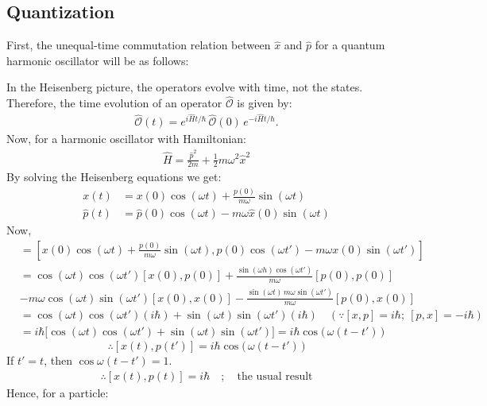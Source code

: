 \documentclass[14pt]{article} %
\begin{document}
{ \subsection{Quantization}
First, the unequal-time commutation relation between $\hat{x}$ and $\hat{p}$ for a quantum harmonic oscillator will be as follows:  

In the Heisenberg picture, the operators evolve with time, not the states. Therefore, the time evolution of an operator $\hat{\mathcal{O}}$ is given by:
\begin{align*}
\hat{\mathcal{O}}(t) = e^{i \hat{H} t / \hbar} \, \hat{\mathcal{O}}(0) \, e^{-i \hat{H} t / \hbar}.
\end{align*}
Now, for a harmonic oscillator with Hamiltonian:
\begin{align*}
\hat{H} = \frac{\hat{p}^2}{2m} + \frac{1}{2} m \omega^2 \hat{x}^2
\end{align*}
By solving the Heisenberg equations we get:
\begin{align*}
x(t) &= x(0) \cos(\omega t) + \frac{p(0)}{m \omega} \sin(\omega t) \\
\hat{p}(t) &= \hat{p}(0) \cos(\omega t) - m \omega \hat{x}(0) \sin(\omega t)
\end{align*}
Now,
\begin{align*}
[ x(t), p(t') ] &= \left[ x(0) \cos(\omega t) + \frac{p(0)}{m \omega} \sin(\omega t),
p(0) \cos(\omega t') - m \omega x(0) \sin(\omega t') \right] 
\\
&= \cos(\omega t) \cos(\omega t') [x(0), p(0)]
+ \frac{\sin(\omega h) \cos(\omega t')}{m \omega} [p(0), p(0)] 
\\
&- m \omega \cos(\omega t) \sin(\omega t') [x(0), x(0)]
- \frac{\sin(\omega t) \, m \omega \sin(\omega t')}{m \omega} [p(0), x(0)]
\\
&= \cos(\omega t) \cos(\omega t') (i \hbar) + \sin(\omega t) \sin(\omega t') (i \hbar) \quad \left(\because [x, p] = i \hbar;~ [p, x] = -i \hbar \right)
\\
&= i \hbar \big[ \cos(\omega t) \cos(\omega t') + \sin(\omega t) \sin(\omega t') \big] = i \hbar \cos\big( \,\omega(t - t')\, \big)
\end{align*}
\[
\therefore [ x(t), p(t') ] = i \hbar \cos\big( \,\omega(t - t')\, \big)
\]
If $t' = t$, then $\cos\omega(t-t') = 1$.
\begin{align*}
\therefore [x(t), p(t)] = i \hbar \quad;\quad \text{the usual result}
\end{align*}
Hence, for a particle:
\begin{align*}

\end{align*}}
\end{document}
